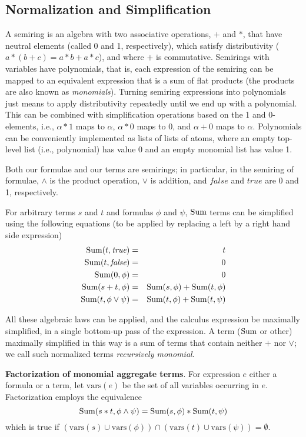 \subsection{Normalization and Simplification}


A semiring is an algebra with two associative operations,
$+$ and $*$, that
have neutral elements (called 0 and 1, respectively), which satisfy
distributivity ($a*(b+c)= a*b + a*c$), and where $+$ is commutative.
Semirings with variables
have polynomials, that is, each expression of the
semiring can be mapped to an equivalent expression that is
a sum of flat products (the products are also known as {\em monomials}\/).
Turning semiring expressions into polynomials just means to apply
distributivity repeatedly until we end up with a polynomial.
This can be combined with simplification operations based on the 1 and
0-elements, i.e., $\alpha * 1$ maps to $\alpha$, $\alpha*0$ maps to $0$, and
$\alpha+0$ maps to $\alpha$. Polynomials can be conveniently implemented
as lists of lists of atoms, where an empty top-level list (i.e., polynomial)
has value 0 and an empty monomial list has value 1.

Both our formulae and our terms are semirings; in particular,
in the semiring of formulae, $\land$ is the product operation,
$\lor$ is addition,
and $\textit{false}$ and $\textit{true}$ are 0 and 1, respectively.

For arbitrary terms $s$ and $t$ and formulas $\phi$ and $\psi$,
$\mbox{Sum}$ terms can be simplified using the following equations (to be
applied by replacing a left by a right hand side expression)
\begin{eqnarray*}
\mbox{Sum}(t, \textit{true}) &=& t \\
\mbox{Sum}(t, \textit{false}) &=& 0 \\
\mbox{Sum}(0, \phi) &=& 0 \\
\mbox{Sum}(s+t, \phi) &=& \mbox{Sum}(s, \phi) + \mbox{Sum}(t, \phi) \\
\mbox{Sum}(t, \phi \lor \psi) &=& \mbox{Sum}(t, \phi) + \mbox{Sum}(t, \psi)
\end{eqnarray*}

All these algebraic laws can be applied, and the calculus expression
be maximally simplified, in a single bottom-up pass of the expression.
A term ($\mbox{Sum}$ or other) maximally simplified in this way
is a sum of terms that contain neither $+$ nor $\lor$; we call such 
normalized terms {\em recursively monomial}.

\def\vars{\mbox{vars}}

{\bf Factorization of monomial aggregate terms}.
For expression $e$ either a formula or a term, let $\vars(e)$
be the set of all variables occurring in $e$.
Factorization employs the equivalence
\[
\mbox{Sum}(s*t, \phi \land \psi) = \mbox{Sum}(s, \phi) * \mbox{Sum}(t, \psi)
\]
which is true if
$(\vars(s) \cup \vars(\phi)) \cap (\vars(t) \cup \vars(\psi)) = \emptyset$.

